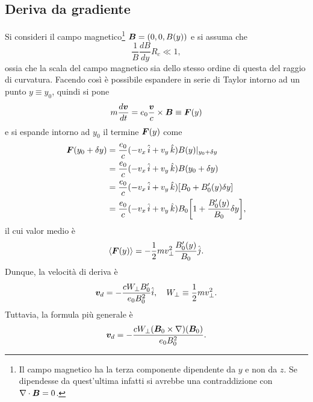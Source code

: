 \subsection{Deriva da gradiente}
Si consideri il campo magnetico\footnote{Il campo magnetico ha la terza componente dipendente da $y$ e non da $z$. Se dipendesse da quest'ultima infatti si avrebbe una contraddizione con $\nabla \cdot \bm{B} = 0$.} $\bm{B} = (0,0,B(y))$ e si assuma che 
\begin{equation}
    \frac{1}{B}\frac{dB}{dy}R_c \ll 1,
\end{equation}
ossia che la scala del campo magnetico sia dello stesso ordine di questa del raggio di curvatura. Facendo così è possibile espandere in serie di Taylor intorno ad un punto $y \equiv y_0$, quindi si pone
\begin{equation}
    m\frac{d\bm{v}}{dt} = e_0\frac{\bm{v}}{c} \times \bm{B} \equiv \bm{F}(y)
\end{equation}
e si espande intorno ad $y_0$ il termine $\bm{F}(y)$ come 
\begin{equation}
    \begin{split}
        \bm{F}(y_0 + \delta y) &= \frac{e_0}{c}(-v_x\,\hat{i} + v_y\,\hat{k})B(y)|_{y_0 + \delta y} \\
        &= \frac{e_0}{c}(-v_x\,\hat{i} + v_y\,\hat{k})B(y_0 + \delta y) \\
        &= \frac{e_0}{c}(-v_x\,\hat{i} + v_y\,\hat{k})[B_0 + B_0'(y)\delta y] \\
        &= \frac{e_0}{c}(-v_x\,\hat{i} + v_y\,\hat{k})B_0\bigg[1 + \frac{B_0'(y)}{B_0}\delta y\bigg],
    \end{split}
\end{equation}
il cui valor medio è 
\begin{equation}
    \langle \bm{F}(y) \rangle = -\frac{1}{2}mv_\perp^2\frac{B_0'(y)}{B_0}\hat{j}.
\end{equation}
Dunque, la velocità di deriva è
\begin{equation}
    \bm{v}_d = -\frac{cW_\perp B_0'}{e_0B_0^2}\hat{i},\quad W_\perp \equiv \frac{1}{2}mv_\perp^2.
\end{equation}
Tuttavia, la formula più generale è
\begin{equation}
    \bm{v}_d = -\frac{cW_\perp(\bm{B}_0 \times \nabla)(\bm{B}_0)}{e_0B_0^2}.
\end{equation}

